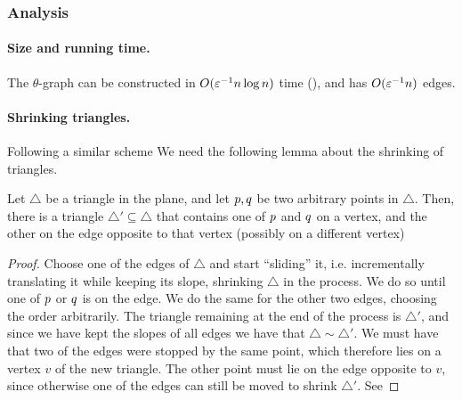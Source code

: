\documentclass[12pt]{article}%
\begin{document}
\subsubsection{Analysis}

\paragraph{Size and running time.}
The $\theta$-graph can be constructed in $O(\varepsilon^{-1}n\log n)$ time (\cite{ns-gsn-07}), and has $O(\varepsilon^{-1}n)$ edges. 

\paragraph{Shrinking triangles.}
Following a similar scheme We need the following lemma about the shrinking of triangles.

\begin{lemma}
	Let $\triangle$ be a triangle in the plane, and let
	$p, q$ be two arbitrary points in $\triangle$. Then, there is a
	triangle $\triangle' \subseteq \triangle$ that contains one of $p$ and $q$ on a vertex, and the other on the edge opposite to that vertex (possibly on a different vertex)

\end{lemma}

\begin{proof}
	Choose one of the edges of $\triangle$ and start ``sliding'' it, i.e. incrementally translating it while keeping its slope, shrinking $\triangle$ in the process. We do so until one of $p$ or $q$ is on the edge. We do the same for the other two edges, choosing the order arbitrarily. The triangle remaining at the end of the process is $\triangle'$, and since we have kept the slopes of all edges we have that $\triangle \sim \triangle'$. We must have that two of the edges were stopped by the same point, which therefore lies on a vertex $v$ of the new triangle. The other point must lie on the edge opposite to $v$, since otherwise one of the edges can still be moved to shrink $\triangle'$. See 

\end{proof}
\end{document}
